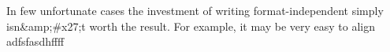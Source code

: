 
In few unfortunate cases the investment of writing format-independent \latex simply isn&amp;#x27;t worth the result. For example, it may be very easy to align adfsfasdhffff